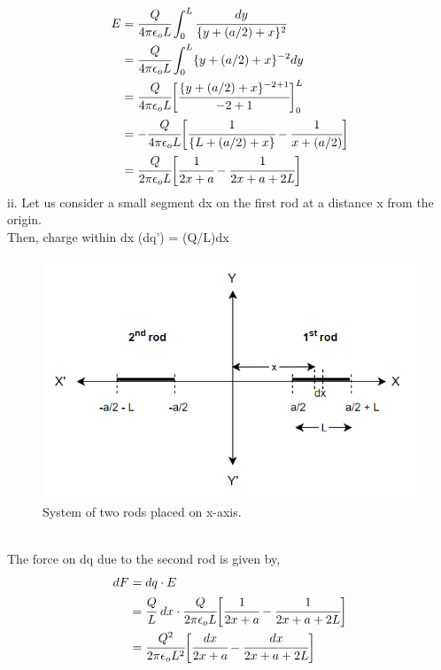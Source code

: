 \begin{align*}
       E &= \cfrac{Q}{4 \pi \epsilon_o L} \int_0^L \cfrac{dy}{{\{y+ (a/2) + x\}^2}}\\
         &= \cfrac{Q}{4 \pi \epsilon_o L} \int_0^L \{y+ (a/2) + x\}^{-2} dy\\
         &= \cfrac{Q}{4 \pi \epsilon_o L} \bigg[\cfrac{\{y+ (a/2) + x\}^{-2+1}}{-2+1}\bigg]_0^L\\
         &= -\cfrac{Q}{4 \pi \epsilon_o L} \bigg[\cfrac{1}{\{L+ (a/2) + x\}} - \cfrac{1}{x + (a/2)}\bigg ]\\
         &= \cfrac{Q}{2 \pi \epsilon_o L} \bigg[\cfrac{1}{2x+a} - \cfrac{1}{2x + a + 2L}\bigg ]
\end{align*}
ii. Let us consider a small segment dx on the first rod at a distance x from the origin.\\ 
Then, charge within dx (dq') = (Q/L)dx
\vspace{3pt}
\begin{figure}[h]
    \centering
    \includegraphics[scale = 0.58]{figures/Sandesh's Figures/2rd2.png}
    \caption{System of two rods placed on x-axis.}
    \label{2rd2}
\end{figure}
\\
The force on dq due to the second rod is given by,
\begin{align*}
    dF &= dq \cdot E\\
       &=\cfrac{Q}{L}\hspace{3pt} dx \cdot \cfrac{Q}{2 \pi \epsilon_o L} \bigg[\cfrac{1}{2x+a} - \cfrac{1}{2x + a + 2L}\bigg ]\\
        &=\cfrac{Q^2}{2 \pi \epsilon_o L^2} \bigg[\cfrac{dx}{2x+a} - \cfrac{dx}{2x + a + 2L}\bigg ]
\end{align*}

